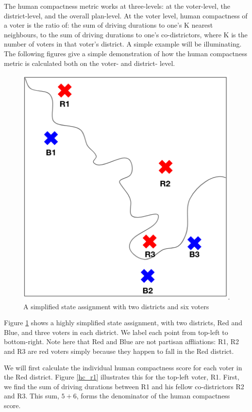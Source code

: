 \documentclass[]{article}
\begin{document}
The human compactness metric works at three-levels: at the voter-level,
the district-level, and the overall plan-level. At the voter level,
human compactness of a voter is the ratio of: the sum of driving
durations to one's K nearest neighbours, to the sum of driving durations
to one's co-districtors, where K is the number of voters in that voter's
district. A simple example will be illuminating. The following figures
give a simple demonstration of how the human compactness metric is
calculated both on the voter- and district- level.

\begin{figure}
\centering
\includegraphics{img/human_compactness_1.png}
\caption{A simplified state assignment with two districts and six voters
\label{hc_demo}}
\end{figure}

Figure \ref{hc_demo} shows a highly simplified state assignment, with
two districts, Red and Blue, and three voters in each district. We label
each point from top-left to bottom-right. Note here that Red and Blue
are not partisan affliations: R1, R2 and R3 are red voters simply
because they happen to fall in the Red district.

We will first calculate the individual human compactness score for each
voter in the Red district. Figure \ref{hc_r1} illustrates this for the
top-left voter, R1. First, we find the sum of driving durations between
R1 and his fellow co-districtors R2 and R3. This sum, \(5 + 6\), forms
the denominator of the human compactness score.
\end{document}
